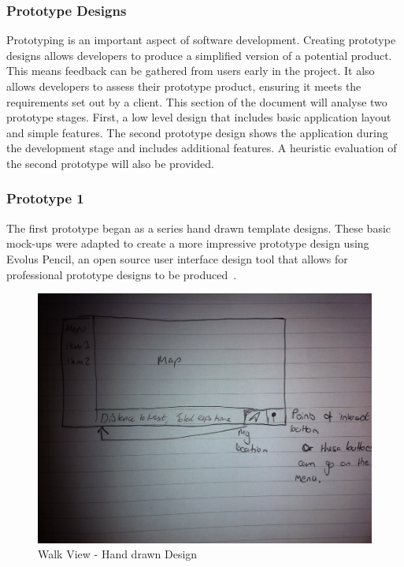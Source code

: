 \documentclass[11pt,a4paper]{article}
\begin{document}
\subsubsection{Prototype Designs}

Prototyping is an important aspect of software development. Creating prototype designs allows developers to produce a simplified version of a potential product. This means feedback can be gathered from users early in the project. It also allows developers to assess their prototype product, ensuring it meets the requirements set out by a client. This section of the document will analyse two prototype stages. First, a low level design that includes basic application layout and simple features. The second prototype design shows the application during the development stage and includes additional features. A heuristic evaluation of the second prototype will also be provided.

\subsubsection{Prototype 1}
\label{sec:prototype1}

The first prototype began as a series hand drawn template designs. These basic mock-ups were adapted to create a more impressive prototype design using Evolus Pencil, an open source user interface design tool that allows for professional prototype designs to be produced~\cite{pencil}.

\begin{figure}[H]
\begin{center}
\includegraphics[angle = 90, width=.8\linewidth]{./img/hand_drawn.jpg}
\caption{Walk View - Hand drawn Design}
\label{fig:handDrawn}
\end{center}
\end{figure}
\end{document}
